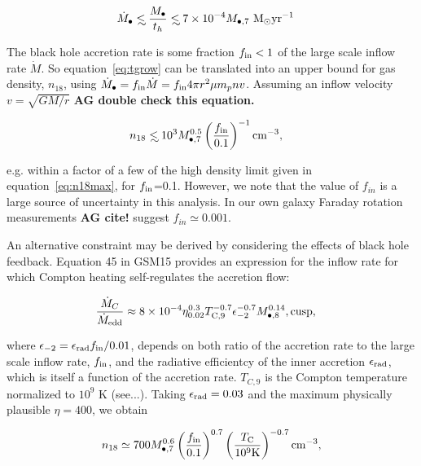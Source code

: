 \documentclass[usenatbib,fleqn]{mn2e}
\newcommand\lsim{\mathrel{\rlap{\lower4pt\hbox{\hskip1pt$\sim$}}
    \raise1pt\hbox{$<$}}}
\newcommand{\Mbh}[1][]{M_{\bullet#1}}
\newcommand{\Msun}{{\rm M_\odot}}
\newcommand{\pyear}{{\rm yr}^{-1}}
\begin{document}
\begin{align}
\dot{M}_{\bullet} &\lsim \frac{\Mbh}{t_h} \lsim 7 \times 10^{-4}
\Mbh[,7] \,\, \Msun \pyear
\label{eq:tgrow}
\end{align}

The black hole accretion rate is some fraction $f_{\rm in}<1$ of the
large scale inflow rate $\dot{M}$. So equation~\eqref{eq:tgrow} can be
translated into an upper bound for gas density, $n_{18}$, using
$\dot{M}_{\bullet} = f_{\rm in} \dot{M} = f_{\rm in} 4 \pi r^2 \mu m_p
n v$.  Assuming an inflow velocity $v=\sqrt{G M/r}$ {\bf AG double
  check this equation.}

\begin{align}
n_{18} &\lsim 10^3 \Mbh[,7]^{0.5} \left(\frac{f_{\rm in}}{0.1}\right)^{-1}
{\rm cm^{-3}}, 
\label{eq:tgrowDens}
\end{align}

e.g. within a factor of a few of the high density limit given in
equation~\eqref{eq:n18max}, for $f_{\rm in}$=0.1. However, we note
that the value of $f_{in}$ is a large source of uncertainty in this
analysis. In our own galaxy Faraday rotation measurements {\bf AG
  cite!} suggest $f_{in}\simeq 0.001$.

An alternative constraint may be derived by considering the effects of
black hole feedback. Equation 45 in GSM15 provides an expression for
the inflow rate for which Compton heating self-regulates the accretion
flow:

\begin{align}
\frac{\dot{M}_{C}}{\dot{M}_{\rm edd}} \approx 
8\times 10^{-4} \eta_{0.02}^{0.3}T_{\rm
C,9}^{-0.7}\epsilon_{-2}^{-0.7} M_{\bullet,8}^{0.14}
&, \text{cusp}, 
  \label{eq:MdotCa}
\end{align}

where $\epsilon_{-2}=\epsilon_{\rm rad} f_{\rm in}/0.01$, depends on
both ratio of the accretion rate to the large scale inflow rate,
$f_{\rm in}$, and the radiative efficientcy of the inner accretion
$\epsilon_{\rm rad}$, which is itself a function of the accretion
rate. $T_{C,9}$ is the Compton temperature normalized to $10^9$
K (see...). Taking $\epsilon_{\rm rad}=0.03$ and the maximum physically
plausible $\eta=400$, we obtain

\begin{align}
n_{18} \simeq 700 \Mbh[,7]^{0.6} \left(\frac{f_{\rm
      in}}{0.1}\right)^{0.7} \left(\frac{T_{\rm C}}{10^9 {\rm
      K}}\right)^{-0.7} {\rm cm^{-3}},
\end{align}
\end{document}
